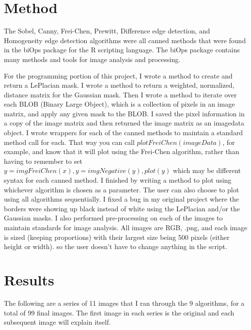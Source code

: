 \documentclass{article}%
\begin{document}
\section{Method}
The Sobel, Canny, Frei-Chen, Prewitt, Difference edge detection, and Homogeneity edge detection algorithms were all canned methods that were found in the biOps package for the R scripting language. The biOps package contains many methods and tools for image analysis and processing.

\indent For the programming portion of this project, I wrote a method to create and return a LePlacian mask. I wrote a method to return a weighted, normalized, distance matrix for the Gaussian mask. Then I wrote a method to iterate 
over each BLOB (Binary Large Object), which is a collection of pixels in an image matrix, and apply any given mask 
to the BLOB. I saved the pixel information in a copy of the image matrix and then returned the image matrix as an 
imagedata object. I wrote wrappers for each of the canned methods to maintain a standard method call for each. 
That way you can call $plotFreiChen(imageData)$, for example, and know that it will plot using the Frei-Chen 
algorithm, rather than having to remember to set $y = imgFreiChen(x), y=imgNegative(y), plot(y)$ which may 
be different syntax for each canned method. I finished by writing a method to plot using whichever algorithm is chosen
 as a parameter. The user can also choose to plot using all algorithms sequentially. I fixed a bug in my original project
 where the borders were showing up black instead of white using the LePlacian and/or the Gaussian masks. I also
 performed pre-processing on each of the images to maintain standards for image analysis. All images are RGB, .png, and each image is sized (keeping proportions) with their largest size being 500 pixels (either height or width).
 so the user doesn’t have to change anything in the script.

\newpage
\section{Results}
The following are a series of 11 images that I ran through the 9 algorithms, for a total of 99 final images. The first image in each series is the original and each subsequent image will explain itself. 
\end{document}
